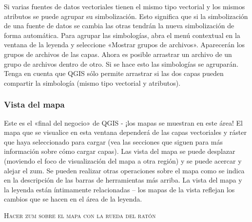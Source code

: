 Si varias fuentes de datos vectoriales tienen el mismo tipo vectorial y los mismos atributos se puede agrupar 
su simbolización. Esto significa que si la simbolización de una fuente de datos se cambia las otras tendrán la 
nueva simbolización de forma automática. Para agrupar las simbologías, abra el menú contextual en la ventana 
de la leyenda y seleccione «Mostrar grupos de archivos». Aparecerán los grupos de archivos de las capas. Ahora 
es posible arrastrar un archivo de un grupo de archivos dentro de otro. Si se hace esto las simbologías se 
agruparán. Tenga en cuenta que QGIS sólo permite arrastrar si las dos capas pueden compartir la simbología 
(mismo tipo vectorial y atributos).  

%

\subsubsection{Vista del mapa}\label{label_mapview}

Este es el «final del negocio» de QGIS - ¡los mapas se muestran en este área! El mapa que se visualice en esta 
ventana dependerá de las capas vectoriales y ráster que haya seleccionado para cargar (vea las secciones que siguen 
para más información sobre cómo cargar capas). Las vista del mapa se puede desplazar (moviendo el foco de 
visualización del mapa a otra región) y se puede acercar y alejar el zum. Se pueden realizar otras operaciones 
sobre el mapa como se indica en la descripción de las barras de herramientas más arriba. La vista del mapa y la 
leyenda están íntimamente relacionadas – los mapas de la vista reflejan los cambios que se hacen en el área de la leyenda.

\begin{Tip}\caption{\textsc{Hacer zum sobre el mapa con la rueda del ratón}}
\end{Tip}

